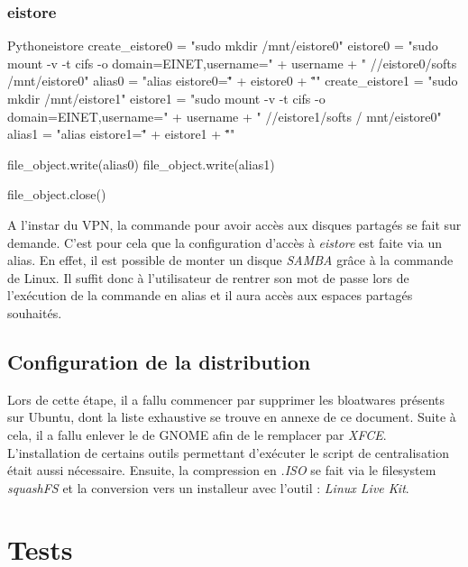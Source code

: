 \subsubsection{eistore}

\begin{listingsbox}{Python}{eistore}
create_eistore0 = "sudo mkdir /mnt/eistore0"
eistore0 = "sudo mount -v -t cifs -o domain=EINET,username=" + username + 
" //eistore0/softs /mnt/eistore0"
alias0 = "alias eistore0=\"" + eistore0 + "\"\n"
create_eistore1 = "sudo mkdir /mnt/eistore1"
eistore1 = "sudo mount -v -t cifs -o domain=EINET,username=" + username + 
" //eistore1/softs / mnt/eistore0"
alias1 = "alias eistore1=\"" + eistore1 + "\"\n"
	
file_object.write(alias0)
file_object.write(alias1)

file_object.close()
\end{listingsbox}

A l'instar du VPN, la commande pour avoir accès aux disques partagés se fait sur demande.
C'est pour cela que la configuration d'accès à \textit{eistore} est faite via un alias.
En effet, il est possible de monter un disque \textit{SAMBA} grâce à la commande  de Linux.
Il suffit donc à l'utilisateur de rentrer son mot de passe lors de l'exécution de la commande en alias et il aura accès aux espaces partagés souhaités.


\subsection{Configuration de la distribution}
Lors de cette étape, il a fallu commencer par supprimer les \gls{bloatwares} présents sur Ubuntu, dont la liste exhaustive se trouve en annexe de ce document.
Suite à cela, il a fallu enlever le \acrfull{de} \Gls{GNOME} afin de le remplacer par \textit{XFCE}.
L'installation de certains outils permettant d'exécuter le script de centralisation était aussi nécessaire.
Ensuite, la compression en \textit{.ISO} se fait via le \gls{filesystem} \textit{squashFS} et la conversion vers un installeur avec l'outil : \textit{Linux Live Kit}.


\section{Tests}

